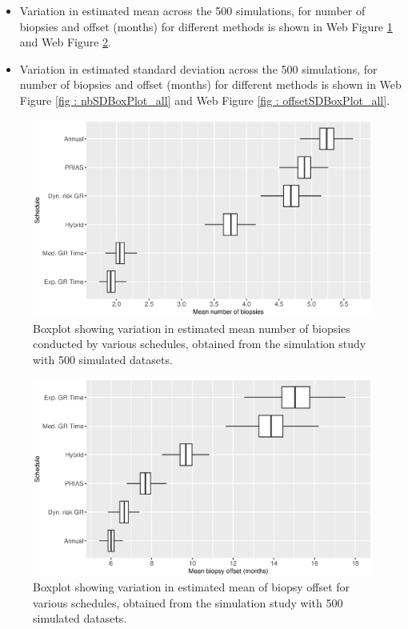 \begin{itemize}
  \item Variation in estimated mean across the 500 simulations, for number of biopsies and offset (months) for different methods is shown in Web Figure \ref{fig : nbMeanBoxPlot_all} and Web Figure \ref{fig : offsetMeanBoxPlot_all}.
  \item Variation in estimated standard deviation across the 500 simulations, for number of biopsies and offset (months) for different methods is shown in Web Figure \ref{fig : nbSDBoxPlot_all} and Web Figure \ref{fig : offsetSDBoxPlot_all}.
\end{itemize}

\begin{figure}[!htb]
\centerline{\includegraphics[width=\columnwidth]{images/sim_study/nbMeanBoxPlot_all.eps}}
\caption{Boxplot showing variation in estimated mean number of biopsies conducted by various schedules, obtained from the simulation study with 500 simulated datasets.}
\label{fig : nbMeanBoxPlot_all}
\end{figure}

\begin{figure}[!htb]
\centerline{\includegraphics[width=\columnwidth]{images/sim_study/offsetMeanBoxPlot_all.eps}}
\caption{Boxplot showing variation in estimated mean of biopsy offset for various schedules, obtained from the simulation study with 500 simulated datasets.}
\label{fig : offsetMeanBoxPlot_all}
\end{figure}

